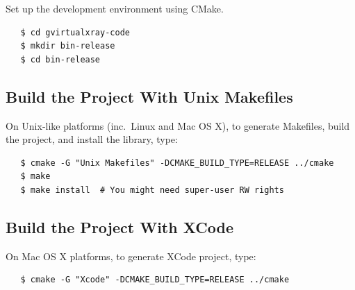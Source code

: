 \documentclass[11pt,oneside,a4paper,final]{article}
\begin{document}
Set up the development environment using CMake.
\begin{verbatim}
   $ cd gvirtualxray-code
   $ mkdir bin-release
   $ cd bin-release
\end{verbatim}

\subsection{Build the Project With Unix Makefiles}
On Unix-like platforms (inc.~Linux and Mac OS X), to generate Makefiles, build the project, and install the library, type:
\begin{verbatim}
   $ cmake -G "Unix Makefiles" -DCMAKE_BUILD_TYPE=RELEASE ../cmake
   $ make
   $ make install  # You might need super-user RW rights
\end{verbatim}

\subsection{Build the Project With XCode}
On Mac OS X platforms, to generate XCode project, type:
\begin{verbatim}
   $ cmake -G "Xcode" -DCMAKE_BUILD_TYPE=RELEASE ../cmake
\end{verbatim}
\end{document}
